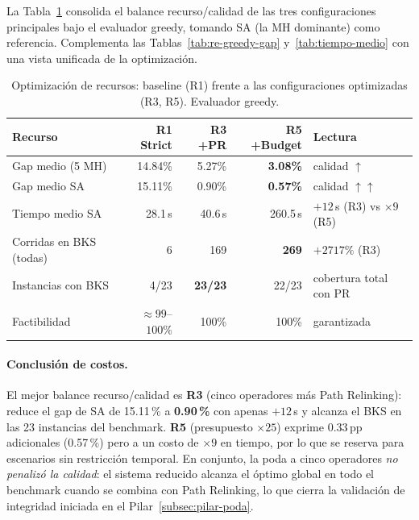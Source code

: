La Tabla~\ref{tab:optimizacion-recursos} consolida el balance
recurso/calidad de las tres configuraciones principales bajo el evaluador
greedy, tomando SA (la MH dominante) como referencia. Complementa las
Tablas~\ref{tab:re-greedy-gap} y~\ref{tab:tiempo-medio} con una vista
unificada de la optimización.

\begin{table}[h]
\centering
\caption{Optimización de recursos: baseline (R1) frente a las
         configuraciones optimizadas (R3, R5). Evaluador greedy.}
\label{tab:optimizacion-recursos}
\small
\begin{tabular}{lrrrl}
\toprule
Recurso & R1 Strict & R3 +PR & R5 +Budget & Lectura \\
\midrule
Gap medio (5 MH)        & 14.84\% & 5.27\%  & \textbf{3.08\%} & calidad $\uparrow$ \\
Gap medio SA            & 15.11\% & 0.90\%  & \textbf{0.57\%} & calidad $\uparrow\uparrow$ \\
Tiempo medio SA         & 28.1\,s & 40.6\,s & 260.5\,s & $+12$\,s (R3) vs $\times 9$ (R5) \\
Corridas en BKS (todas) & 6       & 169     & \textbf{269} & $+2717\%$ (R3) \\
Instancias con BKS      & 4/23    & \textbf{23/23} & 22/23 & cobertura total con PR \\
Factibilidad            & $\approx 99$--$100\%$ & 100\% & 100\% & garantizada \\
\bottomrule
\end{tabular}
\end{table}

\paragraph{Conclusión de costos.}
El mejor balance recurso/calidad es \textbf{R3} (cinco operadores más Path
Relinking): reduce el gap de SA de 15.11\,\% a \textbf{0.90\,\%} con apenas
$+12$\,s y alcanza el BKS en las 23 instancias del benchmark.
\textbf{R5} (presupuesto $\times 25$) exprime 0.33\,pp adicionales
(0.57\,\%) pero a un costo de $\times 9$ en tiempo, por lo que se reserva
para escenarios sin restricción temporal. En conjunto, la poda a cinco
operadores \emph{no penalizó la calidad}: el sistema reducido alcanza el
óptimo global en todo el benchmark cuando se combina con Path Relinking, lo
que cierra la validación de integridad iniciada en el
Pilar~\ref{subsec:pilar-poda}.

